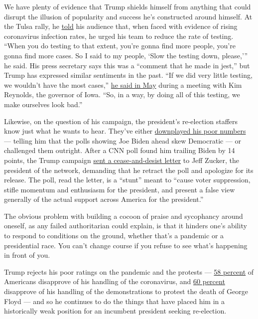 We have plenty of evidence that Trump shields himself from anything that
could disrupt the illusion of popularity and success he's constructed
around himself. At the Tulsa rally, he
\href{https://www.politico.com/news/2020/06/22/white-house-testing-coronavirus-333803}{told}
his audience that, when faced with evidence of rising coronavirus
infection rates, he urged his team to reduce the rate of testing. ``When
you do testing to that extent, you're gonna find more people, you're
gonna find more cases. So I said to my people, `Slow the testing down,
please,''' he said. His press secretary says this was a ``comment that
he made in jest,'' but Trump has expressed similar sentiments in the
past. ``If we did very little testing, we wouldn't have the most
cases,''
\href{https://www.whitehouse.gov/briefings-statements/remarks-president-trump-vice-president-pence-meeting-governor-reynolds-iowa/}{he
said in May} during a meeting with Kim Reynolds, the governor of Iowa.
``So, in a way, by doing all of this testing, we make ourselves look
bad.''

Likewise, on the question of his campaign, the president's re-election
staffers know just what he wants to hear. They've either
\href{https://www.thedailybeast.com/trump-world-thrilled-that-their-terrible-poll-numbers-arent-worse}{downplayed
his poor numbers} --- telling him that the polls showing Joe Biden ahead
skew Democratic --- or challenged them outright. After a CNN poll found
him trailing Biden by 14 points, the Trump campaign
\href{https://www.cnn.com/2020/06/10/politics/trump-campaign-cnn-poll/index.html}{sent
a cease-and-desist letter} to Jeff Zucker, the president of the network,
demanding that he retract the poll and apologize for its release. The
poll, read the letter, is a ``stunt'' meant to ``cause voter
suppression, stifle momentum and enthusiasm for the president, and
present a false view generally of the actual support across America for
the president.''

The obvious problem with building a cocoon of praise and sycophancy
around oneself, as any failed authoritarian could explain, is that it
hinders one's ability to respond to conditions on the ground, whether
that's a pandemic or a presidential race. You can't change course if you
refuse to see what's happening in front of you.

Trump rejects his poor ratings on the pandemic and the protests ---
\href{https://abcnews.go.com/Politics/approval-trumps-coronavirus-response-underwater-returns-campaign-trail/story?id=71351241}{58
percent} of Americans disapprove of his handling of the coronavirus, and
\href{https://www.journalism.org/2020/06/12/majorities-of-americans-say-news-coverage-of-george-floyd-protests-has-been-good-trumps-public-message-wrong/}{60
percent} disapprove of his handling of the demonstrations to protest the
death of George Floyd --- and so he continues to do the things that have
placed him in a historically weak position for an incumbent president
seeking re-election.

